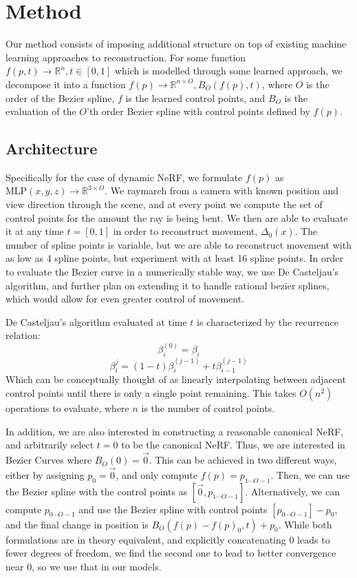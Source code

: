 \section*{Method}

Our method consists of imposing additional structure on top of existing machine learning
approaches to reconstruction. For some function $f(p, t)\to\mathbb{R}^n, t\in[0,1]$ which is modelled through
some learned approach, we decompose it into a function $f(p)\to\mathbb{R}^{n\times O}, B_O(f(p), t)$, where
$O$ is the order of the Bezier spline, $f$ is the learned control points, and $B_O$ is the evaluation
of the $O$'th order Bezier spline with control points defined by $f(p)$.

\subsection*{Architecture}

Specifically for the case of dynamic NeRF, we formulate $f(p)$ as
$\text{MLP}(x,y,z)\to\mathbb{R}^{3\times O}$. We raymarch from a camera with known position and
view direction through the scene, and at every point we compute the set of control points for
the amount the ray is being bent. We then are able to evaluate it at any time $t=[0,1]$ in order
to reconstruct movement, $\Delta_0(x)$. The number of spline points is variable, but we are able
to reconstruct movement with as low as 4 spline points, but experiment with at least 16 spline
points. In order to evaluate the Bezier curve in a numerically stable way, we use De Casteljau's
algorithm, and further plan on extending it to handle rational bezier splines, which would allow
for even greater control of movement.

De Casteljau's algorithm evaluated at time $t$ is characterized by the recurrence relation:
\[ \beta_i^{(0)} = \beta_i \]
\[ \beta_i^{j} = (1-t)\beta_i^{(j-1)} + t\beta_{i-1}^{(j-1)} \]
Which can be conceptually thought of as linearly interpolating between adjacent control points until there is only a single point remaining. This takes $O(n^2)$ operations to evaluate, where $n$ is the number of control points.

In addition, we are also interested in constructing a reasonable canonical NeRF, and arbitrarily select $t = 0$ to be the canonical NeRF. Thus, we are interested in Bezier Curves where $B_O(0) = \overrightarrow{0}$. This can be achieved in two different ways, either by assigning $p_0 = \overrightarrow{0}$, and only compute $f(p) = p_{1\cdots O-1}$. Then, we can use the Bezier spline with the control points as $[\overrightarrow{0}, p_{1\cdots O-1}]$. Alternatively, we can compute $p_{0\cdots O-1}$ and use the Bezier spline with control points $[p_{0\cdots O-1}]-p_0$, and the final change in position is $B_O(f(p)-f(p)_0,t)+p_0$. While both formulations are in theory equivalent, and explicitly concatenating 0 leads to fewer degrees of freedom, we find the second one to lead to better convergence near 0, so we use that in our models.


